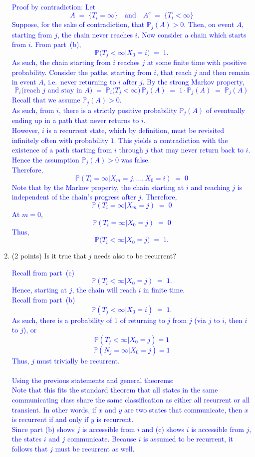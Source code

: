 \documentclass{article}
\begin{document}
\begin{enumerate}[label=(\alph*)]
\textcolor{blue}{
    Proof by contradiction: Let
\[
A \;=\; \bigl\{T_i = \infty\bigr\}
\quad\text{and}\quad
A^c \;=\; \bigl\{T_i < \infty\bigr\}
\]
Suppose, for the sake of contradiction, that \(\mathbb{P}_j(A)>0\). Then,
on event \(A\), starting from \(j\), the chain never reaches \(i\).
Now consider a chain which starts from \(i\). From part~(b),
    \[
    \mathbb{P}\bigl(T_j < \infty\bigr | X_0=i) \;=\; 1.
    \]
As such, the chain starting from \(i\) reaches \(j\) at some finite time with positive probability.
Consider the paths, starting from \(i\), that reach \(j\) and then remain in event \(A\), i.e.\ never returning to \(i\) after \(j\). By the strong Markov property, 
\[
\mathbb{P}_i\bigl(\text{reach }j\text{ and stay in }A\bigr) 
\;=\; 
\mathbb{P}_i\bigl(T_j < \infty\bigr)\,
\mathbb{P}_j(A)
\;=\; 
1 \cdot \mathbb{P}_j(A)
\;=\;
\mathbb{P}_j(A)
\]
Recall that we assume $\mathbb{P}_j(A)>0$. \\
As such, from \(i\), there is a strictly positive probability \(\mathbb{P}_j(A)\) of eventually ending up in a path that never returns to \(i\). \\
However, \(i\) is a recurrent state, which by definition, must be revisited infinitely often with probability \(1\). This yields a contradiction with the existence of a path starting from $i$ through $j$ that may never return back to $i$. 
Hence the assumption \(\mathbb{P}_j(A)>0\) was false. \\ Therefore,
\[
\mathbb{P}(T_i = \infty | X_m=j, ..., X_0=i) \;=\; 0
\]
Note that by the Markov property, the chain starting at $i$ and reaching $j$ is independent of the chain's progress after $j$. 
Therefore,
\[
\mathbb{P}(T_i = \infty | X_m=j) \;=\; 0
\]
At $m=0$, 
\[
\mathbb{P}(T_i = \infty | X_0=j) \;=\; 0
\]
Thus,
\[
\mathbb{P}\bigl(T_i < \infty\bigr | X_0 =j) \;=\; 1.
\]
}


\item (2 points) Is it true that $j$ needs also to be recurrent?

\textcolor{blue}{
Recall from part~(c)
\[
\mathbb{P}(T_i < \infty | X_0 = j) \;=\; 1.
\]
Hence, starting at \(j\), the chain will reach \(i\) in finite time. \\
Recall from part~(b)
\[
\mathbb{P}(T_j < \infty | X_0 = i) \;=\; 1.
\]
As such, there is a probability of \(1\) of returning to \(j\) from $j$ (via \(j\) to \(i\), then \(i\) to \(j\)), or 
$$\mathbb{P}(T_j < \infty | X_0=j)=1$$
$$\mathbb{P}(N_j=\infty | X_0=j)=1$$
Thus, \(j\) must trivially be recurrent. \\ \\ 
Using the previous statements and general theorems: \\ 
Note that this fits the standard theorem that all states in the same communicating class share the same classification as either all recurrent or all transient.
In other words, if \(x\) and \(y\) are two states that communicate, then \(x\) is recurrent if and only if \(y\) is recurrent. \\
Since part (b) shows \(j\) is accessible from \(i\) and (c) shows \(i\) is accessible from \(j\), the states \(i\) and \(j\) communicate. Because \(i\) is assumed to be recurrent, it follows that \(j\) must be recurrent as well.
}


\end{enumerate}
\end{document}
